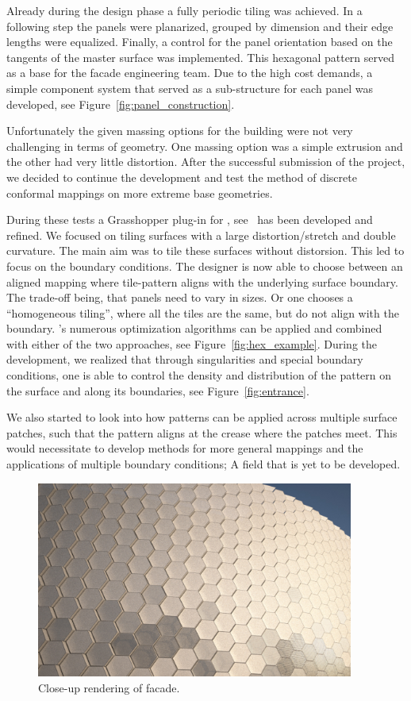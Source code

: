 \documentclass[article.tex]{subfiles}
\begin{document}
Already during the design phase a fully periodic tiling was
achieved. In a following step the panels were planarized, grouped by
dimension and their edge lengths were equalized. Finally, a control
for the panel orientation based on the tangents of the \nurbs master
surface was implemented. This hexagonal pattern served as a base for
the facade engineering team. Due to the high cost demands, a simple
component system that served as a sub-structure for each panel was
developed, see Figure~\ref{fig:panel_construction}.

Unfortunately the given massing options for the building were not very
challenging in terms of geometry. One massing option was a simple
extrusion and the other had very little distortion. After the
successful submission of the project, we decided to continue the
development and test the method of discrete conformal mappings on more
extreme base geometries.

During these tests a Grasshopper plug-in for \VaryLab,
see~\cite{varylab-web-page} has been developed and refined. We focused
on tiling surfaces with a large distortion/stretch and double
curvature. The main aim was to tile these surfaces without
distorsion. This led to focus on the boundary conditions. The designer
is now able to choose between an aligned mapping where tile-pattern
aligns with the underlying surface boundary. The trade-off being, that
panels need to vary in sizes. Or one chooses a ``homogeneous tiling'',
where all the tiles are the same, but do not align with the
boundary. \VaryLab's numerous optimization algorithms can be applied
and combined with either of the two approaches, see
Figure~\ref{fig:hex_example}. During the development, we realized that
through singularities and special boundary conditions, one is able to
control the density and distribution of the pattern on the surface and
along its boundaries, see Figure~\ref{fig:entrance}.

We also started to look into how patterns can be applied across
multiple surface patches, such that the pattern aligns at the crease
where the patches meet. This would necessitate to develop methods for
more general mappings and the applications of multiple boundary
conditions; A field that is yet to be developed.


\begin{figure}[bt]
  \centering
  \includegraphics[width=0.93\textwidth]{images/henn/detail.jpg}
  \caption{Close-up rendering of facade.}
  \label{fig:detail}
\end{figure}
\end{document}
